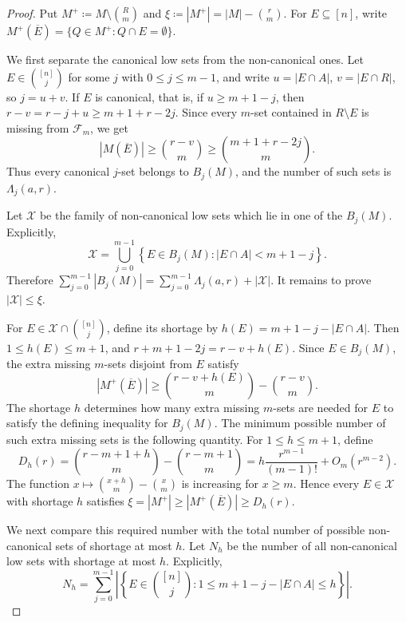 \documentclass[10pt,a4paper]{amsart}
\newcommand{\F}{\mathcal F}
\begin{document}
\begin{proof}
    Put \(M^+\coloneqq M\setminus\binom Rm\) and
    \(\xi\coloneqq |M^+|=|M|-\binom rm\).
    For \(E\subseteq[n]\), write
    \(M^+(\overline E)=\{Q\in M^+:Q\cap E=\emptyset\}\).

    We first separate the canonical low sets from the non-canonical ones.  Let \(E\in\binom{[n]}j\) for some $j$ with \(0\le j\le m-1\), and write
    \(u=|E\cap A|\), \(v=|E\cap R|\), so \(j=u+v\).
    If \(E\) is canonical, that is, if \(u\ge m+1-j\), then
    \(r-v=r-j+u\ge m+1+r-2j\).
    Since every \(m\)-set contained in \(R\setminus E\) is missing from \(\F_m\), we get
    \[
        |M(\overline E)|\ge\binom{r-v}{m}
        \ge \binom{m+1+r-2j}{m}.
    \]
    Thus every canonical \(j\)-set belongs to \(B_j(M)\), and the number of
    such sets is \(\Lambda_j(a,r)\).

    Let \(\mathcal X\) be the family of non-canonical low sets which lie in
    one of the \(B_j(M)\).  Explicitly,
    \[
        \mathcal X=
        \bigcup_{j=0}^{m-1}
        \left\{
        E\in B_j(M): |E\cap A|<m+1-j
        \right\}.
    \]
    Therefore
    \(\sum_{j=0}^{m-1}|B_j(M)| = \sum_{j=0}^{m-1}\Lambda_j(a,r)+|\mathcal X|.\)
    It remains to prove \(|\mathcal X|\le\xi\).

    For \(E\in\mathcal X\cap\binom{[n]}j\), define its shortage by
    \(h(E)=m+1-j-|E\cap A|\).  Then \(1\le h(E)\le m+1\), and
    \(r+m+1-2j=r-v+h(E)\).  Since \(E\in B_j(M)\), the extra missing
    \(m\)-sets disjoint from \(E\) satisfy
    \[
        |M^+(\overline E)|
        \ge
        \binom{r-v+h(E)}m-\binom{r-v}m.
    \]
    The shortage $h$ determines how many extra missing $m$-sets are needed
    for $E$ to satisfy the defining inequality for $B_j(M)$.  The minimum possible number
    of such extra missing sets is the following quantity.
    For \(1\le h\le m+1\), define
    \begin{equation}\label{eq:case1-dh}
        D_h(r)=\binom{r-m+1+h}{m}-\binom{r-m+1}{m}=h \frac{r^{m-1}}{(m-1)!}+O_m(r^{m-2}).
    \end{equation}
    The function \(x\mapsto\binom{x+h}{m}-\binom xm\) is increasing for \(x\ge m\).
    Hence every \(E\in\mathcal X\) with shortage \(h\) satisfies
    \(\xi=|M^+|\ge |M^+(\overline E)|\ge D_h(r).\)

    We next compare this required number with the total number of possible
    non-canonical sets of shortage at most $h$.  Let \(N_h\) be the number of
    all non-canonical low sets with shortage at most \(h\).  Explicitly,
    \[
        N_h=
        \sum_{j=0}^{m-1}
        \left|
        \left\{
        E\in\binom{[n]}j:
        1\le m+1-j-|E\cap A|\le h
        \right\}
        \right|.
    \]


\end{proof}
\end{document}
